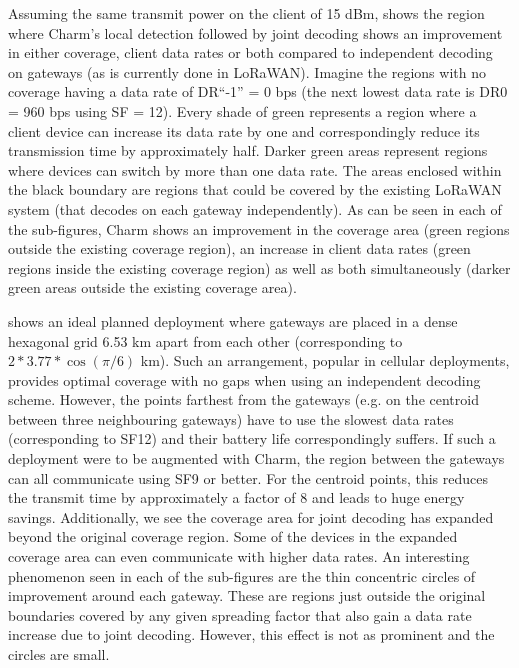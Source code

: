 Assuming the same transmit power on the client of 15 dBm,  shows the region where Charm's local detection followed by joint decoding shows an improvement in either coverage, client data rates or both compared to independent decoding on gateways (as is currently done in LoRaWAN). Imagine the regions with no coverage having a data rate of DR``-1'' = 0 bps (the next lowest data rate is DR0 = 960 bps using SF = 12). Every shade of green represents a region where a client device can increase its data rate by one and correspondingly reduce its transmission time by approximately half. Darker green areas represent regions where devices can switch by more than one data rate. The areas enclosed within the black boundary are regions that could be covered by the existing LoRaWAN system (that decodes on each gateway independently). As can be seen in each of the sub-figures, Charm shows an improvement in the coverage area (green regions outside the existing coverage region), an increase in client data rates (green regions inside the existing coverage region) as well as both simultaneously (darker green areas outside the existing coverage area).

 shows an ideal planned deployment where gateways are placed in a dense hexagonal grid 6.53 km apart from each other (corresponding to $2*3.77*\cos(\pi/6)$ km). Such an arrangement, popular in cellular deployments, provides optimal coverage with no gaps when using an independent decoding scheme. However, the points farthest from the gateways (e.g. on the centroid between three neighbouring gateways) have to use the slowest data rates (corresponding to SF12) and their battery life correspondingly suffers. If such a deployment were to be augmented with Charm, the region between the gateways can all communicate using SF9 or better. For the centroid points, this reduces the transmit time by approximately a factor of 8 and leads to huge energy savings. Additionally, we see the coverage area for joint decoding has expanded beyond the original coverage region. Some of the devices in the expanded coverage area can even communicate with higher data rates. An interesting phenomenon seen in each of the sub-figures are the thin concentric circles of improvement around each gateway. These are regions just outside the original boundaries covered by any given spreading factor that also gain a data rate increase due to joint decoding. However, this effect is not as prominent and the circles are small.

